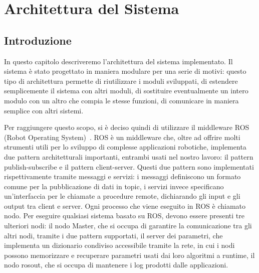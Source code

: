 \chapter{Architettura del Sistema}
\label{cap:architettura}
\thispagestyle{empty}

\begin{quotation}
{\footnotesize
\noindent \emph{}
\begin{flushright}
\end{flushright}
}
\end{quotation}
\vspace{0.5cm}

\section{Introduzione}

In questo capitolo descriveremo l'architettura del sistema implementato. Il sistema è stato progettato in maniera modulare per una serie di motivi: questo tipo di architettura permette di riutilizzare i moduli sviluppati, di estendere semplicemente il sistema con altri moduli, di sostituire eventualmente un intero modulo con un altro che compia le stesse funzioni, di comunicare in maniera semplice con altri sistemi. 

Per raggiungere questo scopo, si è deciso quindi di utilizzare il middleware ROS (Robot Operating System)~\cite{quigley2009ros}.
ROS è un middleware che, oltre ad offrire molti strumenti utili per lo sviluppo di complesse applicazioni robotiche, implementa due pattern architetturali importanti, entrambi usati nel nostro lavoro: il pattern publish-subscribe e il pattern client-server.
Questi due pattern sono implementati rispettivamente tramite messaggi e servizi: i messaggi definiscono un formato comune per la pubblicazione di dati in topic, i servizi invece specificano un'interfaccia per le chiamate a procedure remote, dichiarando gli input e gli output tra client e server.
Ogni processo che viene eseguito in ROS è chiamato nodo. Per eseguire qualsiasi sistema basato su ROS, devono essere presenti tre ulteriori nodi: il nodo Master, che si occupa di garantire la comunicazione tra gli altri nodi, tramite i due pattern supportati, il server dei parametri, che implementa un dizionario condiviso accessibile tramite la rete, in cui i nodi possono memorizzare e recuperare parametri usati dai loro algoritmi a runtime, il nodo rosout, che si occupa di mantenere i log prodotti dalle applicazioni.

